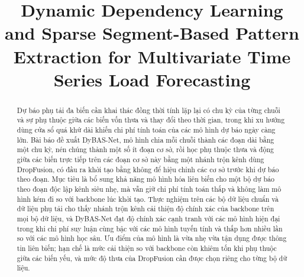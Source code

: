 \documentclass[conference]{IEEEtran}
\begin{document}
\title{Dynamic Dependency Learning and Sparse Segment-Based Pattern Extraction for Multivariate Time Series Load
Forecasting}

\author{
\IEEEauthorblockA{\\ \\ \\}
\and
{}
\IEEEauthorblockA{\\ \\ \\}
\and
{}
\IEEEauthorblockA{\\ \\ \\}
}

\maketitle

\begin{abstract}
Dự báo phụ tải đa biến cần khai thác đồng thời tính lặp lại có chu kỳ của từng chuỗi và sự phụ thuộc giữa các biến vốn
thưa và thay đổi theo thời gian, trong khi xu hướng dùng cửa sổ quá khứ dài khiến chi phí tính toán của các mô hình dự
báo ngày càng lớn.
Bài báo đề xuất DyBAS-Net, mô hình chia mỗi chuỗi thành các đoạn dài bằng một chu kỳ, nén chúng thành một số ít đoạn cơ
sở, rồi học phụ thuộc thưa và động giữa các biến trực tiếp trên các đoạn cơ sở này bằng một nhánh trộn kênh dùng
DropFusion, có đầu ra khởi tạo bằng không để hiệu chỉnh các cơ sở trước khi dự báo theo đoạn.
Mục tiêu là bổ sung khả năng mô hình hóa liên biến cho một bộ dự báo theo đoạn độc lập kênh siêu nhẹ, mà vẫn giữ chi phí
tính toán thấp và không làm mô hình kém đi so với backbone lúc khởi tạo.
Thực nghiệm trên các bộ dữ liệu chuẩn và dữ liệu phụ tải cho thấy nhánh trộn kênh cải thiện độ chính xác của backbone
trên mọi bộ dữ liệu, và DyBAS-Net đạt độ chính xác cạnh tranh với các mô hình hiện đại trong khi chi phí suy luận cùng
bậc với các mô hình tuyến tính và thấp hơn nhiều lần so với các mô hình học sâu.
Ưu điểm của mô hình là vừa nhẹ vừa tận dụng được thông tin liên biến; hạn chế là mức cải thiện so với backbone còn khiêm
tốn khi phụ thuộc giữa các biến yếu, và mức độ thưa của DropFusion cần được chọn riêng cho từng bộ dữ liệu.
\end{abstract}
\end{document}
